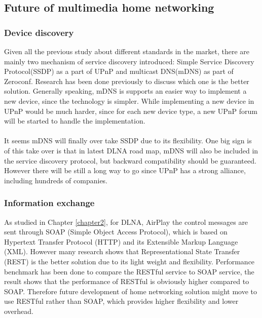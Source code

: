 \subsection{Future of multimedia home networking\label{5_3}}
\subsubsection{Device discovery}
Given all the previous study about different standards in the market, there are mainly two mechanism of service discovery introduced: Simple Service Discovery Protocol(SSDP) as a part of UPnP and multicast DNS(mDNS) as part of Zeroconf. Research \cite{zeroconf_vs_upnp} has been done previously to discuss which one is the better solution. Generally speaking, mDNS is supports an easier way to implement a new device, since the technology is simpler. While implementing a new device in UPnP would be much harder, since for each new device type, a new UPnP forum will be started to handle the implementation.\\
\\
It seems mDNS will finally over take SSDP due to its flexibility. One big sign is of this take over is that in latest DLNA road map, mDNS will also be included in the service discovery protocol, but backward compatibility should be guaranteed. However there will be still a long way to go since UPnP has a strong alliance, including hundreds of companies.
\subsubsection{Information exchange}
As studied in Chapter \ref{chapter2}, for DLNA, AirPlay the control messages are sent through SOAP (Simple Object Access Protocol), which is based on Hypertext Transfer Protocol (HTTP) and its Extensible Markup Language (XML). However many research \cite{restful_webservice} shows that Representational State Transfer (REST) is the better solution due to its light weight and flexibility. Performance benchmark \cite{performance_restful_saop} has been done to compare the RESTful service to SOAP service, the result shows that the performance of RESTful is obviously higher compared to SOAP. Therefore future development of home networking solution might move to use RESTful rather than SOAP, which provides higher flexibility and lower overhead.
